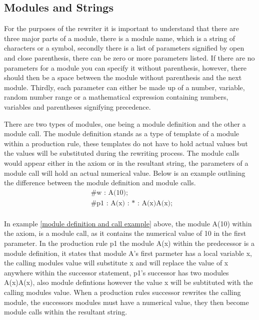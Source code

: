 \subsection{Modules and Strings}

\begin{flushleft}

For the purposes of the rewriter it is important to understand that there are three major parts of a module, there is a module name, which is a string of characters or a symbol, secondly there is a list of parameters signified by open and close parenthesis, there can be zero or more parameters listed. If there are no parameters for a module you can specify it without parenthesis, however, there should then be a space between the module without parenthesis and the next module. Thirdly, each parameter can either be made up of a number, variable, random number range or a mathematical expression containing  numbers, variables and parentheses signifying precedence. \\   

\vspace{5mm}

There are two types of modules, one being a module definition and the other a module call. The module definition stands as a type of template of a module within a production rule, these templates do not have to hold actual values but the values will be substituted during the rewriting process. The module calls would appear either in the axiom or in the resultant string, the parameters of a module call will hold an actual numerical value. Below is an example outlining the difference between the module definition and module calls.\\ 

\begin{equation} \label{module definition and call example}
\begin{aligned}
	&\text{\#w : A(10);}\\
	&\text{\#p1 : A(x) : * : A(x)A(x); }\\
\end{aligned}
\end{equation}

In example \ref{module definition and call example} above, the module A(10) within the axiom, is a module call, as it contains the numerical value of 10 in the first parameter. In the production rule p1 the module A(x) within the predecessor is a module definition, it states that module A's first parmeter has a local variable x, the calling modules value will substitute x and will replace the value of x anywhere within the successor statement, p1's successor has two modules A(x)A(x), also module defintions however the value x will be subtituted with the calling modules value. When a production rules successor rewrites the calling module, the successors modules must have a numerical value, they then become module calls within the resultant string. \\ 


\end{flushleft}
